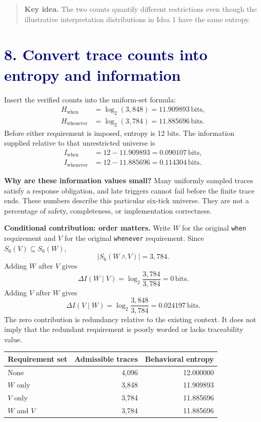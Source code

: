 \documentclass[11pt,a4paper]{article}
\newcommand{\lesson}[2]{\section*{\textcolor{navy}{#1. #2}}}
\newcommand{\key}[1]{\begin{quote}\color{teal}\textbf{Key idea.} #1\end{quote}}
\newcommand{\bits}{\,\mathrm{bits}}
\begin{document}
\key{The two counts quantify different restrictions even though the illustrative interpretation distributions in Idea 1 have the same entropy.}
\newpage

\lesson{8}{Convert trace counts into entropy and information}
Insert the verified counts into the uniform-set formula:
\begin{align*}
H_{\mathrm{when}}&=\log_2(3,848)=11.909893\bits,\\
H_{\mathrm{whenever}}&=\log_2(3,784)=11.885696\bits.
\end{align*}
Before either requirement is imposed, entropy is 12 bits. The information supplied relative to that unrestricted universe is
\begin{align*}
I_{\mathrm{when}}&=12-11.909893=0.090107\bits,\\
I_{\mathrm{whenever}}&=12-11.885696=0.114304\bits.
\end{align*}

\textbf{Why are these information values small?} Many uniformly sampled traces satisfy a response obligation, and late triggers cannot fail before the finite trace ends. These numbers describe this particular six-tick universe. They are not a percentage of safety, completeness, or implementation correctness.

\textbf{Conditional contribution: order matters.} Write \(W\) for the original \texttt{when} requirement and \(V\) for the original \texttt{whenever} requirement. Since \(S_6(V)\subseteq S_6(W)\),
\[
|S_6(W\land V)|=3,784.
\]
Adding \(W\) after \(V\) gives
\[
\Delta I(W\mid V)=\log_2\frac{3,784}{3,784}=\boxed{0\bits}.
\]
Adding \(V\) after \(W\) gives
\[
\Delta I(V\mid W)=\log_2\frac{3,848}{3,784}
=\boxed{0.024197\bits}.
\]
The zero contribution is redundancy relative to the existing context. It does not imply that the redundant requirement is poorly worded or lacks traceability value.

\begin{center}
\begin{tabular}{lrr}
\toprule
Requirement set & Admissible traces & Behavioral entropy\\\midrule
None & 4,096 & 12.000000\\
\(W\) only & 3,848 & 11.909893\\
\(V\) only & 3,784 & 11.885696\\
\(W\) and \(V\) & 3,784 & 11.885696\\\bottomrule
\end{tabular}
\end{center}
\end{document}

